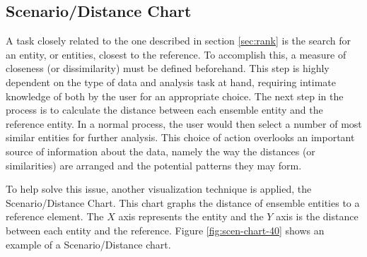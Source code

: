 \documentclass[final,5p,times,twocolumn]{elsarticle}
\begin{document}
\subsection{Scenario/Distance Chart}
\label{sec:scen}
A task closely related to the one described in section \ref{sec:rank} is the search for an entity, or entities, closest to the reference. To accomplish this, a measure of closeness (or dissimilarity) must be defined beforehand. This step is highly dependent on the type of data and analysis task at hand, requiring intimate knowledge of both by the user for an appropriate choice. The next step in the process is to calculate the distance between each ensemble entity and the reference entity. In a normal process, the user would then select a number of most similar entities for further analysis. This choice of action overlooks an important source of information about the data, namely the way the distances (or similarities) are arranged and the potential patterns they may form.

To help solve this issue, another visualization technique is applied, the Scenario/Distance Chart. This chart graphs the distance of ensemble entities to a reference element. The $X$ axis represents the entity and the $Y$ axis is the distance between each entity and the reference. Figure \ref{fig:scen-chart-40} shows an example of a Scenario/Distance chart.
\end{document}
